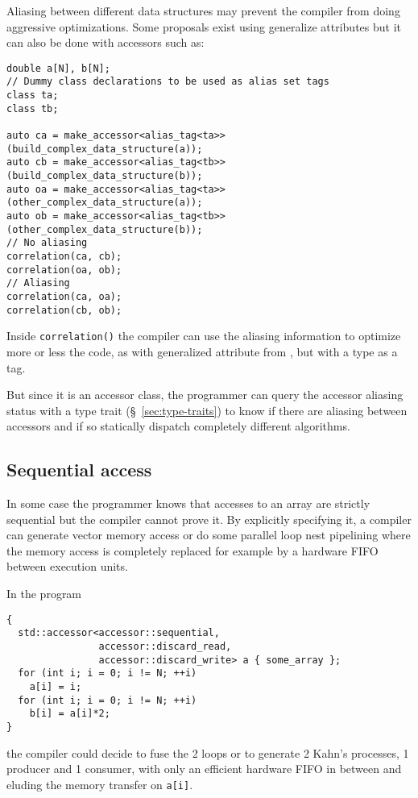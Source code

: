\documentclass[a4paper]{article}
\begin{document}
Aliasing between different data structures may prevent the compiler
from doing aggressive optimizations. Some proposals exist using
generalize attributes \cite{C++:N3988:aliasing} but it can also be
done with accessors such as:
\begin{lstlisting}
double a[N], b[N];
// Dummy class declarations to be used as alias set tags
class ta;
class tb;

auto ca = make_accessor<alias_tag<ta>>(build_complex_data_structure(a));
auto cb = make_accessor<alias_tag<tb>>(build_complex_data_structure(b));
auto oa = make_accessor<alias_tag<ta>>(other_complex_data_structure(a));
auto ob = make_accessor<alias_tag<tb>>(other_complex_data_structure(b));
// No aliasing
correlation(ca, cb);
correlation(oa, ob);
// Aliasing
correlation(ca, oa);
correlation(cb, ob);
\end{lstlisting}

Inside \lstinline|correlation()| the compiler can use the aliasing
information to optimize more or less the code, as with generalized
attribute from \cite{C++:N3988:aliasing}, but with a type as a tag.

But since it is an accessor class, the programmer can query the
accessor aliasing status with a type trait (\S~\ref{sec:type-traits})
to know if there are aliasing between accessors and if so statically
dispatch completely different algorithms.


\subsection{Sequential access}
\label{sec:sequential-access}

In some case the programmer knows that accesses to an array are
strictly sequential but the compiler cannot prove it. By explicitly
specifying it, a compiler can generate vector memory access or do some
parallel loop nest pipelining where the memory access is completely
replaced for example by a hardware FIFO between execution units.

In the program
\begin{lstlisting}
{
  std::accessor<accessor::sequential,
                accessor::discard_read,
                accessor::discard_write> a { some_array };
  for (int i; i = 0; i != N; ++i)
    a[i] = i;
  for (int i; i = 0; i != N; ++i)
    b[i] = a[i]*2;
}
\end{lstlisting}
the compiler could decide to fuse the 2 loops or to generate 2 Kahn's
processes, 1 producer and 1 consumer, with only an efficient hardware
FIFO in between and eluding the memory transfer on \lstinline|a[i]|.
\end{document}
